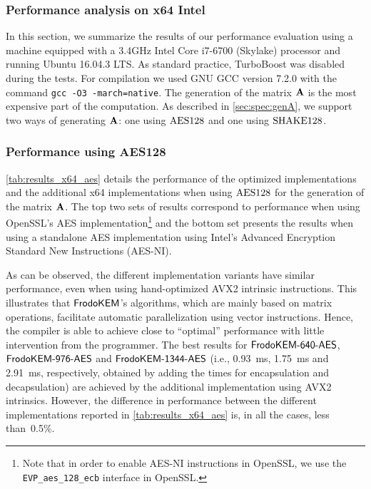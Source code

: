 \subsubsection{Performance analysis on x64 Intel}\label{sec:results_x64}

\ifshoworiginal
In this section, we summarize the results of our performance evaluation using a machine equipped with a 3.4GHz Intel Core i7-6700 (Skylake) processor and running Ubuntu 16.04.3 LTS. As standard practice, TurboBoost was disabled during the tests. For compilation we used GNU GCC version 7.2.0 with the command {\tt gcc -O3 -march=native}. 
The generation of the matrix $\mathbf{A}$ is the most expensive part of the computation. As described in \autoref{sec:spec:genA}, we support two ways of generating $\mathbf{A}$: one using $\textrm{\upshape\mdseries AES128}$ and one using $\textrm{\upshape\mdseries SHAKE}128$.


\subsubsection{Performance using AES128}\label{sec:results_aes}

\autoref{tab:results_x64_aes} details the performance of the optimized implementations and the additional x64 implementations when using $\textrm{\upshape\mdseries AES128}$ for the generation of the matrix $\mathbf{A}$. The top two sets of results correspond to performance when using OpenSSL's AES implementation\footnote{Note that in order to enable AES-NI instructions in OpenSSL, we use the \texttt{EVP\_aes\_128\_ecb} interface in OpenSSL.} and the bottom set presents the results when using a standalone AES implementation using Intel's Advanced Encryption Standard New Instructions (AES-NI).

As can be observed, the different implementation variants have similar performance, even when using hand-optimized AVX2 intrinsic instructions. This illustrates that $\textsf{\upshape\mdseries FrodoKEM}$'s algorithms, which are mainly based on matrix operations, facilitate automatic parallelization using vector instructions. Hence, the compiler is able to achieve close to ``optimal'' performance with little intervention from the programmer.
The best results for $\textsf{\upshape\mdseries FrodoKEM-640-AES}$, $\textsf{\upshape\mdseries FrodoKEM-976-AES}$ and $\textsf{\upshape\mdseries FrodoKEM-1344-AES}$ (i.e., 0.93~ms, 1.75~ms and 2.91~ms, respectively, obtained by adding the times for encapsulation and decapsulation) are achieved by the additional implementation using AVX2 intrinsics. However, the difference in performance between the different implementations reported in \autoref{tab:results_x64_aes} is, in all the cases, less than~0.5\%.

